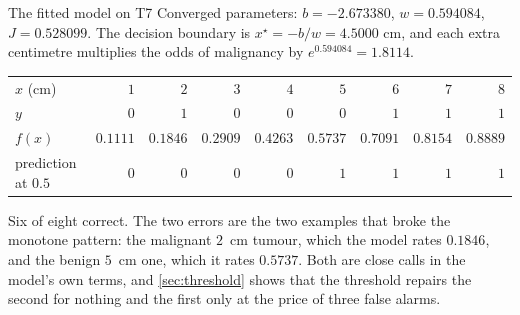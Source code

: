 \begin{workedexample}{The fitted model on T7}
Converged parameters: $b = -2.673380$, $w = 0.594084$, $J = 0.528099$.
The decision boundary is $x^\star = -b/w = 4.5000$ cm, and each extra centimetre
multiplies the odds of malignancy by $e^{0.594084} = 1.8114$.

\begin{center}
\footnotesize
\setlength{\tabcolsep}{4pt}
\renewcommand{\arraystretch}{1.15}
\begin{tabular}{@{}l*{8}{r}@{}}
\toprule
$x$ (cm)         & $1$ & $2$ & $3$ & $4$ & $5$ & $6$ & $7$ & $8$\\
$y$              & $0$ & $1$ & $0$ & $0$ & $0$ & $1$ & $1$ & $1$\\
$f(x)$           & $0.1111$ & $0.1846$ & $0.2909$ & $0.4263$ & $0.5737$
                 & $0.7091$ & $0.8154$ & $0.8889$\\
prediction at $0.5$ & $0$ & $0$ & $0$ & $0$ & $1$ & $1$ & $1$ & $1$\\
\bottomrule
\end{tabular}
\end{center}

Six of eight correct. The two errors are the two examples that broke the
monotone pattern: the malignant $2$~cm tumour, which the model rates $0.1846$,
and the benign $5$~cm one, which it rates $0.5737$. Both are close calls in the
model's own terms, and \cref{sec:threshold} shows that the threshold repairs the
second for nothing and the first only at the price of three false alarms.
\end{workedexample}

